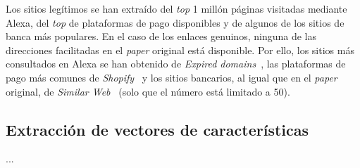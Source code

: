 Los sitios legítimos se han extraído del \textit{top} 1 millón páginas visitadas mediante Alexa, del \textit{top} de plataformas de pago disponibles y de algunos de los sitios de banca más populares. En el caso de los enlaces genuinos, ninguna de las direcciones facilitadas en el \textit{paper} original está disponible. Por ello, los sitios más consultados en Alexa se han obtenido de \textit{Expired domains}~\cite{AlexaTopWebsites}, las plataformas de pago más comunes de \textit{Shopify}~\cite{paymentGatewaysWebsites} y los sitios bancarios, al igual que en el \textit{paper} original, de \textit{Similar Web}~\cite{banksitesTop} (solo que el número está limitado a 50).

\subsection{Extracción de vectores de características}
...
